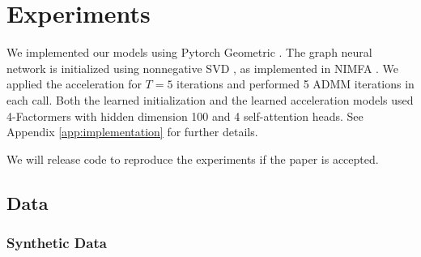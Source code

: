 \documentclass{article}
\begin{document}
\section{Experiments}
We implemented our models using Pytorch Geometric \citep{Fey2019}. The graph neural network is initialized using nonnegative SVD \citep{Boutsidis2008}, as implemented in NIMFA \citep{Zitnik2012}. We applied the acceleration for $T=5$ iterations and performed 5 ADMM iterations in each call. Both the learned initialization and the learned acceleration models used 4-Factormers with hidden dimension 100 and 4 self-attention heads. See Appendix \ref{app:implementation} for further details.

We will release code to reproduce the experiments if the paper is accepted.


\subsection{Data}

\subsubsection{Synthetic Data}
\end{document}
